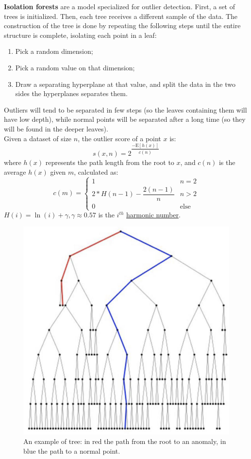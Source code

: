 \textbf{Isolation forests} are a model specialized for outlier detection. First, a set of trees is initialized. Then, each tree receives a different sample of the data. The construction of the tree is done by repeating the following steps until the entire structure is complete, isolating each point in a leaf:
\begin{enumerate}
    \item Pick a random dimension;
    \item Pick a random value on that dimension;
    \item Draw a separating hyperplane at that value, and split the data in the two sides the hyperplanes separates them.
\end{enumerate}
Outliers will tend to be separated in few steps (so the leaves containing them will have low depth), while normal points will be separated after a long time (so they will be found in the deeper leaves). \\
Given a dataset of size $n$, the outlier score of a point $x$ is:
\begin{equation*}
    s(x,n) = 2^{\dfrac{-\mathrm{E}[h(x)]}{c(n)}}
\end{equation*}
where $h(x)$ represents the path length from the root to $x$, and $c(n)$ is the average $h(x)$ given $m$, calculated as:
\begin{equation*}
    c(m) = \begin{cases}
        1 & n = 2 \\
        2 * H(n-1) - \dfrac{2(n-1)}{n} & n > 2 \\
        0 & \text{else}
    \end{cases}
\end{equation*}
$H(i) = \ln(i) + \gamma, \gamma \approx 0.57$ is the $i^{th}$ \hyperlink{https://en.wikipedia.org/wiki/Harmonic_number}{harmonic number}.
\begin{figure}[ht]
    \centering
    \includegraphics[width=0.35\linewidth]{img/isolation_tree.png}
    \caption{An example of tree: in red the path from the root to an anomaly, in blue the path to a normal point.}
    \label{fig:isolation-tree}
\end{figure}
